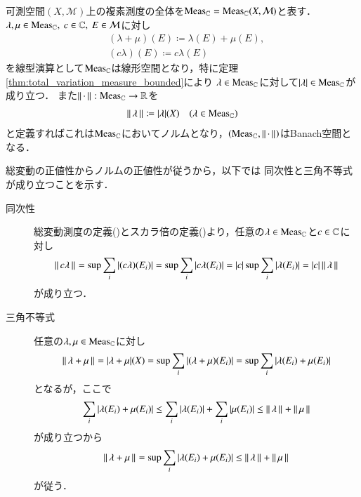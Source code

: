 	\begin{itembox}[l]{}
		\begin{thm}
			可測空間$(X,\mathcal{M})$上の複素測度の全体を$\mathrm{Meas}_{\mathbb{C}} = \mathrm{Meas}_{\mathbb{C}}(X,\mathcal{M})$と表す．
			$\lambda,\mu \in \mathrm{Meas}_{\mathbb{C}},\ c \in \mathbb{C},\ E \in \mathcal{M}$に対し
			\begin{align}
				&(\lambda + \mu)(E) \coloneqq \lambda(E) + \mu(E), \\
				&(c\lambda)(E) \coloneqq c\lambda(E)
				\label{complex_measure_linear}
			\end{align}
			を線型演算として$\mathrm{Meas}_{\mathbb{C}}$は線形空間となり，特に定理\ref{thm:total_variation_measure_bounded}により
			$\lambda \in \mathrm{Meas}_{\mathbb{C}}$に対して$|\lambda| \in \mathrm{Meas}_{\mathbb{C}}$が成り立つ．
			また$\left\|\, \cdot\, \right\|_{}:\mathrm{Meas}_{\mathbb{C}} \rightarrow \mathbb{R}$を
			\begin{align}
				\left\|\, \lambda\, \right\|_{} \coloneqq |\lambda|(X) \quad (\lambda \in \mathrm{Meas}_{\mathbb{C}})
			\end{align}
			と定義すればこれは$\mathrm{Meas}_{\mathbb{C}}$においてノルムとなり，$\left( \mathrm{Meas}_{\mathbb{C}},\left\|\, \cdot\, \right\|_{} \right)$はBanach空間となる．
		\end{thm}
	\end{itembox}
	
	\begin{prf}
	総変動の正値性からノルムの正値性が従うから，以下では
	同次性と三角不等式が成り立つことを示す．
	\begin{description}
		\item[同次性]
			総変動測度の定義()とスカラ倍の定義()より，任意の$\lambda \in \mathrm{Meas}_{\mathbb{C}}$と$c \in \mathbb{C}$に対し
			\begin{align}
				\left\|\, c\lambda\, \right\|_{} = \operatorname*{sup}_{} \sum_{i}|(c\lambda)(E_i)| = \operatorname*{sup}_{} \sum_{i}|c\lambda(E_i)| = |c|\operatorname*{sup}_{} \sum_{i}|\lambda(E_i)| = |c|\left\|\, \lambda\, \right\|_{}
			\end{align}
			が成り立つ．
			
		\item[三角不等式]
			任意の$\lambda,\mu \in \mathrm{Meas}_{\mathbb{C}}$に対し
			\begin{align}
				\left\|\, \lambda + \mu\, \right\|_{} = |\lambda + \mu|(X) = \operatorname*{sup}_{} \sum_{i} |(\lambda + \mu)(E_i)| = \operatorname*{sup}_{} \sum_{i} |\lambda(E_i) + \mu(E_i)|
			\end{align}
			となるが，ここで
			\begin{align}
				\sum_{i} |\lambda(E_i) + \mu(E_i)| \leq \sum_{i} |\lambda(E_i)| + \sum_{i} |\mu(E_i)| \leq \left\|\, \lambda\, \right\|_{} + \left\|\, \mu\, \right\|_{}
			\end{align}
			が成り立つから
			\begin{align}
				\left\|\, \lambda + \mu\, \right\|_{} = \operatorname*{sup}_{} \sum_{i} |\lambda(E_i) + \mu(E_i)| \leq \left\|\, \lambda\, \right\|_{} + \left\|\, \mu\, \right\|_{}
			\end{align}
			が従う．
	\end{description}
	\QED
	\end{prf}
	
